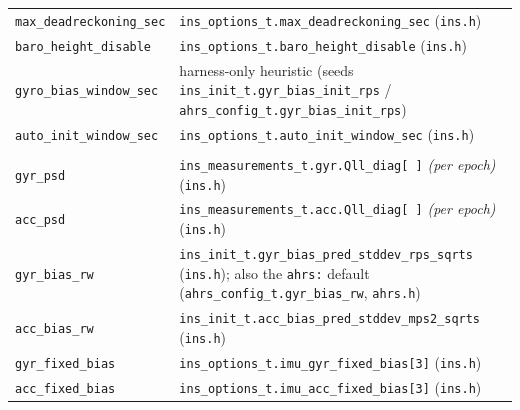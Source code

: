 \documentclass[11pt,a4paper]{article}
\newcommand{\code}[1]{\texttt{#1}}
\begin{document}
\begin{landscape}
\begin{center}
\begin{longtable}{@{}p{6.5cm}p{16.5cm}@{}}
\code{max\_\allowbreak{}deadreckoning\_\allowbreak{}sec} & \code{ins\_\allowbreak{}options\_\allowbreak{}t.max\_\allowbreak{}deadreckoning\_\allowbreak{}sec} (\code{ins.h}) \\
\code{baro\_\allowbreak{}height\_\allowbreak{}disable} & \code{ins\_\allowbreak{}options\_\allowbreak{}t.baro\_\allowbreak{}height\_\allowbreak{}disable} (\code{ins.h}) \\
\code{gyro\_\allowbreak{}bias\_\allowbreak{}window\_\allowbreak{}sec} & harness-only heuristic (seeds \code{ins\_\allowbreak{}init\_\allowbreak{}t.gyr\_\allowbreak{}bias\_\allowbreak{}init\_\allowbreak{}rps} / \code{ahrs\_\allowbreak{}config\_\allowbreak{}t.gyr\_\allowbreak{}bias\_\allowbreak{}init\_\allowbreak{}rps}) \\
\code{auto\_\allowbreak{}init\_\allowbreak{}window\_\allowbreak{}sec} & \code{ins\_\allowbreak{}options\_\allowbreak{}t.auto\_\allowbreak{}init\_\allowbreak{}window\_\allowbreak{}sec} (\code{ins.h}) \\
\addlinespace
\multicolumn{2}{l}{\textbf{\code{imu:}, noise model and calibration}} \\
\code{gyr\_\allowbreak{}psd}             & \code{ins\_\allowbreak{}measurements\_\allowbreak{}t.gyr.Qll\_\allowbreak{}diag[\,]} \emph{(per epoch)} (\code{ins.h}) \\
\code{acc\_\allowbreak{}psd}             & \code{ins\_\allowbreak{}measurements\_\allowbreak{}t.acc.Qll\_\allowbreak{}diag[\,]} \emph{(per epoch)} (\code{ins.h}) \\
\code{gyr\_\allowbreak{}bias\_\allowbreak{}rw}        & \code{ins\_\allowbreak{}init\_\allowbreak{}t.gyr\_\allowbreak{}bias\_\allowbreak{}pred\_\allowbreak{}stddev\_\allowbreak{}rps\_\allowbreak{}sqrts} (\code{ins.h}); also the \code{ahrs:} default (\code{ahrs\_\allowbreak{}config\_\allowbreak{}t.gyr\_\allowbreak{}bias\_\allowbreak{}rw}, \code{ahrs.h}) \\
\code{acc\_\allowbreak{}bias\_\allowbreak{}rw}        & \code{ins\_\allowbreak{}init\_\allowbreak{}t.acc\_\allowbreak{}bias\_\allowbreak{}pred\_\allowbreak{}stddev\_\allowbreak{}mps2\_\allowbreak{}sqrts} (\code{ins.h}) \\
\code{gyr\_\allowbreak{}fixed\_\allowbreak{}bias}     & \code{ins\_\allowbreak{}options\_\allowbreak{}t.imu\_\allowbreak{}gyr\_\allowbreak{}fixed\_\allowbreak{}bias[3]} (\code{ins.h}) \\
\code{acc\_\allowbreak{}fixed\_\allowbreak{}bias}     & \code{ins\_\allowbreak{}options\_\allowbreak{}t.imu\_\allowbreak{}acc\_\allowbreak{}fixed\_\allowbreak{}bias[3]} (\code{ins.h}) \\

\end{longtable}
\end{center}
\end{landscape}
\end{document}
